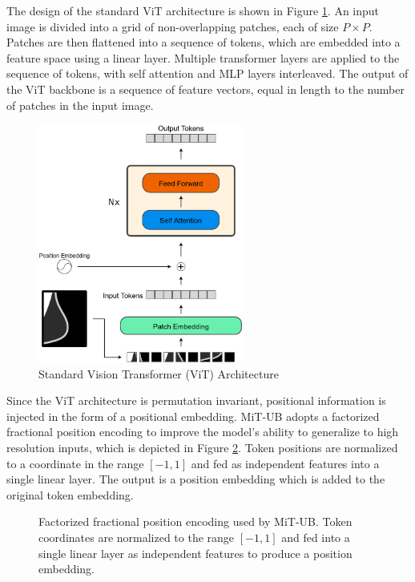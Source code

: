 \documentclass[12pt]{article}
\begin{document}
The design of the standard ViT architecture is shown in Figure \ref{fig:vit}. An input image is divided into a grid of non-overlapping patches, each of size $P \times P$. 
Patches are then flattened into a sequence of tokens, which are embedded into a feature space using a linear layer.
Multiple transformer layers are applied to the sequence of tokens, with self attention and MLP layers interleaved. 
The output of the ViT backbone is a sequence of feature vectors, equal in length to the number of patches in the input image.

\begin{figure}[H]
    \centering
    \includegraphics[width=0.6\textwidth]{./figures/vit.png}
    \caption{Standard Vision Transformer (ViT) Architecture}
    \label{fig:vit}
\end{figure}

Since the ViT architecture is permutation invariant, positional information is injected in the form of a positional embedding.
MiT-UB adopts a factorized fractional position encoding to improve the model's ability to generalize to high resolution inputs, which is depicted in Figure \ref{fig:position-encoding}. 
Token positions are normalized to a coordinate in the range $[-1, 1]$ and fed as independent features into a single linear layer. The output is a position embedding which is added to the original token embedding.


\begin{figure}[H]
    \centering
    
    \caption{Factorized fractional position encoding used by MiT-UB. Token coordinates are normalized to the range $[-1, 1]$ and fed into a single linear layer as independent features to produce a position embedding.
    }
    \label{fig:position-encoding}
\end{figure}
\end{document}

